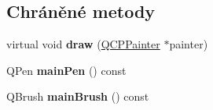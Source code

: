 \subsection*{Chráněné metody}
\begin{DoxyCompactItemize}
\item 
\hypertarget{classQCPItemTracer_aaaf49b48382c730ec9be0e74c2538315}{}virtual void {\bfseries draw} (\hyperlink{classQCPPainter}{Q\+C\+P\+Painter} $\ast$painter)\label{classQCPItemTracer_aaaf49b48382c730ec9be0e74c2538315}

\item 
\hypertarget{classQCPItemTracer_af87132b7698d5bb35c96a8a0b9e7180e}{}Q\+Pen {\bfseries main\+Pen} () const \label{classQCPItemTracer_af87132b7698d5bb35c96a8a0b9e7180e}

\item 
\hypertarget{classQCPItemTracer_aaf4e72e2d87f53279b9f9ba624961bf5}{}Q\+Brush {\bfseries main\+Brush} () const \label{classQCPItemTracer_aaf4e72e2d87f53279b9f9ba624961bf5}

\end{DoxyCompactItemize}
